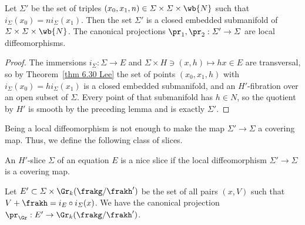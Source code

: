 \begin{lem}
    Let $\varSigma'$ be the set of triples $(x_0,x_1,n)\in \varSigma\times\varSigma\times \wb{N}$ such that $i_\varSigma(x_0)=n i_\varSigma(x_1)$. Then the set $\varSigma'$ is a closed embedded submanifold of $\varSigma\times\varSigma\times \wb{N}$. The canonical projections $\pr_1,\pr_2:\varSigma'\to \varSigma$ are local diffeomorphisms.
\end{lem}
\begin{proof}
    The immersions $i_\varSigma:\varSigma\to E$ and $\varSigma\times H\ni (x,h)\mapsto hx\in E$ are transversal, so by Theorem~\ref{thm 6.30 Lee} the set of points $(x_0,x_1,h)$ with $i_\varSigma(x_0)=hi_\varSigma(x_1)$ is a closed embedded submanifold, and an $H'$-fibration over an open subset of $\varSigma$. Every point of that submanifold has $h\in N$, so the quotient by $H'$ is smooth by the preceding lemma and is exactly $\varSigma'$.
\end{proof}

Being a local diffeomorphism is not enough to make the map $\varSigma'\to \varSigma$ a covering map. Thus, we define the following class of slices.

\begin{defn}
    An $H'$-slice $\varSigma$ of an equation $E$ is a nice slice if the local diffeomorphism $\varSigma'\to \varSigma$ is a covering map.
\end{defn}

Let $E'\subset \varSigma\times\Gr_k(\frakg\slash\frakh')$ be the set of all pairs $(x,V)$ such that $V+\frakh=i_E\circ i_\varSigma(x)$. We have the canonical projection $\pr_{\Gr}:E'\to \Gr_k(\frakg\slash\frakh')$.

